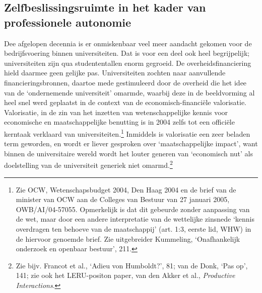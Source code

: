 \documentclass[smallauthor, chapterhaspagenum, nochapterinheader, pagenuminheader,  bigchapnum,medium2, tocpages, garamond, titleinheader]{jote-book}
\begin{document}
	\subsection{Zelfbeslissingsruimte in het kader van professionele autonomie}



	Dee afgelopen decennia is er onmiskenbaar veel meer aandacht gekomen voor de bedrijfsvoering binnen universiteiten. Dat is voor een deel ook heel begrijpelijk; universiteiten zijn qua studententallen enorm gegroeid. De overheidsfinanciering hield daarmee geen gelijke pas. Universiteiten zochten naar aanvullende financieringsbronnen, daartoe mede gestimuleerd door de overheid die het idee van de ‘ondernemende universiteit' omarmde, waarbij deze in de beeldvorming al heel snel werd geplaatst in de context van de economisch-financiële valorisatie. Valorisatie, in de zin van het inzetten van wetenschappelijke kennis voor economische en maatschappelijke benutting is in 2004 zelfs tot een officiële kerntaak verklaard van universiteiten.\footnote{Zie OCW, Wetenschapsbudget 2004, Den Haag 2004 en de brief van de minister van OCW aan de Colleges van Bestuur van 27 januari 2005, OWB/AI/04-57055. Opmerkelijk is dat dit gebeurde zonder aanpassing van de wet, maar door een andere interpretatie van de wettelijke zinsnede ‘kennis overdragen ten behoeve van de maatschappij' (art. 1:3, eerste lid, WHW) in de hiervoor genoemde brief. Zie uitgebreider Kummeling, ‘Onafhankelijk onderzoek en openbaar bestuur', 211.} Inmiddels is valorisatie een zeer beladen term geworden, en wordt er liever gesproken over ‘maatschappelijke impact', want binnen de universitaire wereld wordt het louter generen van ‘economisch nut' als doelstelling van de universiteit generiek niet omarmd.\footnote{Zie bijv. Francot et al., ‘Adieu von Humboldt?', 81; van de Donk, ‘Pas op', 141; zie ook het LERU-positon paper, van den Akker et al., \emph{Productive}\emph{ }\emph{Interactions}.}
\end{document}
